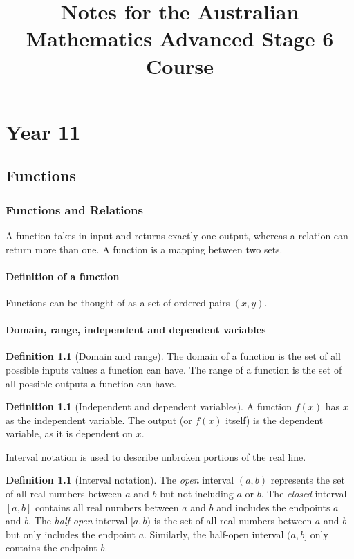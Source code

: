 \documentclass[12pt]{book}
\title{Notes for the Australian Mathematics Advanced Stage 6 Course}
\date{}
\theoremstyle{definition}
\newtheorem{defi}[theo]{Definition}
\begin{document}
	\maketitle
	\tableofcontents
\part{Year 11}
\chapter{Functions}
\section{Functions and Relations}
  A function takes in input and returns exactly one output, whereas a relation can return more than one. A function is a
  mapping between two sets.
\subsection{Definition of a function}
  Functions can be thought of as a set of ordered pairs $(x,y)$.
\subsection{Domain, range, independent and dependent variables}
  \begin{defi}[Domain and range]
  	The domain of a function is the set of all possible inputs values a function can have. The range of a function is 
  	the set of all possible outputs a function can have.
  \end{defi}
  \begin{defi}[Independent and dependent variables]
  	A function $f(x)$ has $x$ as the independent variable. The output (or $f(x)$ itself) is the dependent variable, as it
  	is dependent on $x$.
  \end{defi}
  \noindent Interval notation is used to describe unbroken portions of the real line.
  \begin{defi}[Interval notation]
  	The \textit{open} interval $(a,b)$ represents the set of all real numbers between $a$ and $b$ but not including $a$ or $b$.
  	The \textit{closed} interval $[a,b]$ contains all real numbers between $a$ and $b$ and includes the endpoints $a$ and $b$. 
  	The \textit{half-open} interval $[a,b)$ is the set of all real numbers between $a$ and $b$ but only includes the endpoint $a$.
  	Similarly, the half-open interval $(a,b]$ only contains the endpoint $b$.
  \end{defi}
\end{document}
